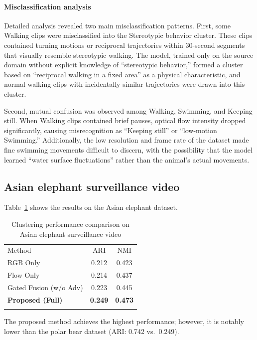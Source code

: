 \documentclass[twocolumn]{svjour3}
\begin{document}
\paragraph{Misclassification analysis}
Detailed analysis revealed two main misclassification patterns.
First, some Walking clips were misclassified into the Stereotypic behavior cluster.
These clips contained turning motions or reciprocal trajectories within 30-second segments that visually resemble stereotypic walking.
The model, trained only on the source domain without explicit knowledge of ``stereotypic behavior,'' formed a cluster based on ``reciprocal walking in a fixed area'' as a physical characteristic, and normal walking clips with incidentally similar trajectories were drawn into this cluster.

Second, mutual confusion was observed among Walking, Swimming, and Keeping still.
When Walking clips contained brief pauses, optical flow intensity dropped significantly, causing misrecognition as ``Keeping still'' or ``low-motion Swimming.''
Additionally, the low resolution and frame rate of the dataset made fine swimming movements difficult to discern, with the possibility that the model learned ``water surface fluctuations'' rather than the animal's actual movements.

\subsection{Asian elephant surveillance video}

Table~\ref{tab:results_elephant} shows the results on the Asian elephant dataset.

\begin{table}[t]
  \caption{Clustering performance comparison on Asian elephant surveillance video}
  \label{tab:results_elephant}
  \begin{tabular}{lcc}
    \hline\noalign{\smallskip}
    Method & ARI & NMI \\
    \noalign{\smallskip}\hline\noalign{\smallskip}
    RGB Only & 0.212 & 0.423 \\
    Flow Only & 0.214 & 0.437 \\
    Gated Fusion (w/o Adv) & 0.223 & 0.445 \\
    \textbf{Proposed (Full)} & \textbf{0.249} & \textbf{0.473} \\
    \noalign{\smallskip}\hline
  \end{tabular}
\end{table}

The proposed method achieves the highest performance; however, it is notably lower than the polar bear dataset (ARI: 0.742 vs.\ 0.249).
\end{document}
